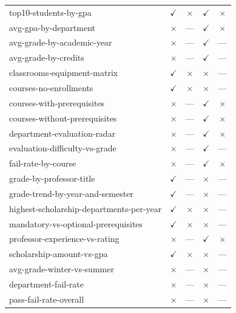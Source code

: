 \begin{longtable}{lcccc}
top10-students-by-gpa & $\checkmark$ & $\times$ & $\checkmark$ & $\times$ \\
avg-gpa-by-department & $\times$ & --- & $\checkmark$ & $\times$ \\
avg-grade-by-academic-year & $\times$ & --- & $\checkmark$ & --- \\
avg-grade-by-credits & $\times$ & --- & $\checkmark$ & --- \\
classrooms-equipment-matrix & $\checkmark$ & $\times$ & $\times$ & --- \\
courses-no-enrollments & $\checkmark$ & $\times$ & $\times$ & --- \\
courses-with-prerequisites & $\times$ & --- & $\checkmark$ & $\times$ \\
courses-without-prerequisites & $\times$ & --- & $\checkmark$ & $\times$ \\
department-evaluation-radar & $\times$ & --- & $\checkmark$ & $\times$ \\
evaluation-difficulty-vs-grade & $\times$ & --- & $\checkmark$ & --- \\
fail-rate-by-course & $\times$ & --- & $\checkmark$ & $\times$ \\
grade-by-professor-title & $\checkmark$ & --- & $\times$ & --- \\
grade-trend-by-year-and-semester & $\checkmark$ & --- & $\times$ & --- \\
highest-scholarship-departments-per-year & $\checkmark$ & $\times$ & $\times$ & --- \\
mandatory-vs-optional-prerequisites & $\checkmark$ & $\times$ & $\times$ & --- \\
professor-experience-vs-rating & $\times$ & --- & $\checkmark$ & $\times$ \\
scholarship-amount-vs-gpa & $\checkmark$ & $\times$ & $\times$ & --- \\
avg-grade-winter-vs-summer & $\times$ & --- & $\times$ & --- \\
department-fail-rate & $\times$ & --- & $\times$ & --- \\
pass-fail-rate-overall & $\times$ & --- & $\times$ & --- \\
\end{longtable}
